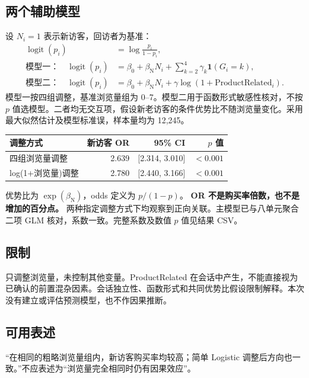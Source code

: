 \documentclass[UTF8,a4paper,11pt,fontset=fandol]{ctexart}
\begin{document}
\subsection*{两个辅助模型}
设 $N_i=1$ 表示新访客，回访者为基准：
\begin{align*}
\operatorname{logit}(p_i)&=\log\frac{p_i}{1-p_i},\\
\text{模型一：}\quad\operatorname{logit}(p_i)
&=\beta_0+\beta_{\mathrm{N}}N_i+
\sum_{k=2}^{4}\gamma_k\mathbf{1}(G_i=k),\\
\text{模型二：}\quad\operatorname{logit}(p_i)
&=\beta_0+\beta_{\mathrm{N}}N_i+
\gamma\log(1+\mathrm{ProductRelated}_i).
\end{align*}
模型一按四组调整，基准浏览量组为 0--7。模型二用于函数形式敏感性核对，不按 $p$ 值选模型。二者均无交互项，假设新老访客的条件优势比不随浏览量变化。采用最大似然估计及模型标准误，样本量均为 12,245。
\begin{center}
\begin{tabular}{lrrr}
\toprule 调整方式 & 新访客 OR & 95\% CI & $p$ 值\\ \midrule
四组浏览量调整 & 2.639 & [2.314, 3.010] & $<0.001$ \\
log(1+浏览量)调整 & 2.780 & [2.440, 3.166] & $<0.001$ \\
\bottomrule\end{tabular}\end{center}
优势比为 $\exp(\beta_{\mathrm{N}})$，odds 定义为 $p/(1-p)$。
\textbf{OR 不是购买率倍数，也不是增加的百分点。}
两种指定调整方式下均观察到正向关联。主模型已与八单元聚合二项 GLM 核对，系数一致。完整系数及数值 $p$ 值见结果 CSV。
\subsection*{限制}
只调整浏览量，未控制其他变量。ProductRelated 在会话中产生，不能直接视为已确认的前置混杂因素。会话独立性、函数形式和共同优势比假设限制解释。本次没有建立或评估预测模型，也不作因果推断。
\subsection*{可用表述}
“在相同的粗略浏览量组内，新访客购买率均较高；简单 Logistic 调整后方向也一致。”不应表述为“浏览量完全相同时仍有因果效应”。
\end{document}
